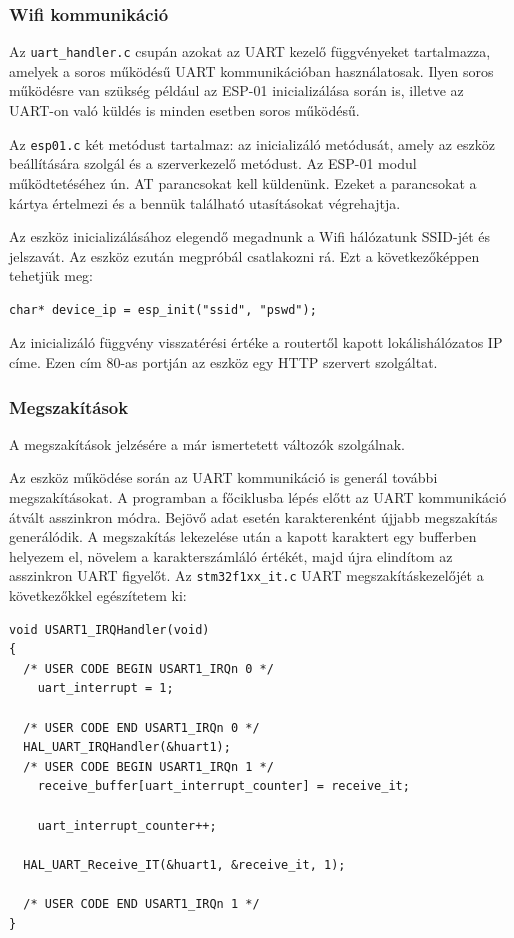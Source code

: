 \documentclass[a4paper, 12pt]{article}
\begin{document}
\subsubsection{Wifi kommunikáció}

Az \texttt{uart\_handler.c} csupán azokat az UART kezelő függvényeket tartalmazza, amelyek a soros működésű UART kommunikációban használatosak. Ilyen soros működésre van szükség például az ESP-01 inicializálása során is, illetve az UART-on való küldés is minden esetben soros működésű.

\bigskip

Az \texttt{esp01.c} két metódust tartalmaz: az inicializáló metódusát, amely az eszköz beállítására szolgál és a szerverkezelő metódust.
Az ESP-01 modul működtetéséhez ún. AT parancsokat kell küldenünk. Ezeket a parancsokat a kártya értelmezi és a bennük található utasításokat végrehajtja.

Az eszköz inicializálásához elegendő megadnunk a Wifi hálózatunk SSID-jét és jelszavát. Az eszköz ezután megpróbál csatlakozni rá. Ezt a következőképpen tehetjük meg:
\begin{lstlisting}[style=CStyle]
char* device_ip = esp_init("ssid", "pswd");
\end{lstlisting}
Az inicializáló függvény visszatérési értéke a routertől kapott lokálishálózatos IP címe. Ezen cím 80-as portján az eszköz egy HTTP szervert szolgáltat.

\subsubsection{Megszakítások}

A megszakítások jelzésére a már ismertetett változók szolgálnak.

Az eszköz működése során az UART kommunikáció is generál további megszakításokat.
A programban a főciklusba lépés előtt az UART kommunikáció átvált asszinkron módra. Bejövő adat esetén karakterenként újjabb megszakítás generálódik. A megszakítás lekezelése után a kapott karaktert egy bufferben helyezem el, növelem a karakterszámláló értékét, majd újra elindítom az asszinkron UART figyelőt.
Az \texttt{stm32f1xx\_it.c} UART megszakításkezelőjét a következőkkel egészítetem ki: 
\begin{lstlisting}[style=CStyle]
void USART1_IRQHandler(void)
{
  /* USER CODE BEGIN USART1_IRQn 0 */
	uart_interrupt = 1;

  /* USER CODE END USART1_IRQn 0 */
  HAL_UART_IRQHandler(&huart1);
  /* USER CODE BEGIN USART1_IRQn 1 */
	receive_buffer[uart_interrupt_counter] = receive_it;

	uart_interrupt_counter++;

  HAL_UART_Receive_IT(&huart1, &receive_it, 1);

  /* USER CODE END USART1_IRQn 1 */
}
\end{lstlisting}
\end{document}

